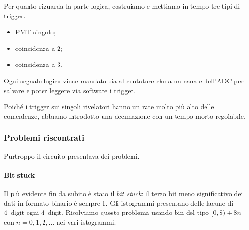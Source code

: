 Per quanto riguarda la parte logica, costruiamo e mettiamo in tempo tre tipi di trigger:
\begin{itemize}
	\item PMT singolo;
	\item coincidenza a 2;
	\item coincidenza a 3.
\end{itemize}
Ogni segnale logico viene mandato sia al contatore che a un canale dell'ADC
per salvare e poter leggere via software i trigger.


Poiché i trigger sui singoli rivelatori hanno un rate molto più alto delle coincidenze,
abbiamo introdotto una decimazione con un tempo morto regolabile.

\subsubsection{Problemi riscontrati}

Purtroppo il circuito presentava dei problemi.

\paragraph{Bit stuck}

Il più evidente fin da subito è stato il \emph{bit stuck}: il terzo bit meno significativo dei dati in formato binario è sempre 1.
Gli istogrammi presentano delle lacune di \SI{4}{digit} ogni \SI{4}{digit}. Risolviamo questo problema usando bin del tipo $[0,8)+8n$ con  $n=0,1,2,\dots$ nei vari istogrammi.

